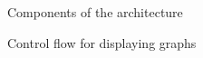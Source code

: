 \begin{figure}[p]
    \caption{\label{fig:maw_components} Components of the architecture}
\end{figure}

\begin{figure}[htbp]
    \caption{\label{fig:maw_controlflow} Control flow for displaying graphs}
\end{figure}


